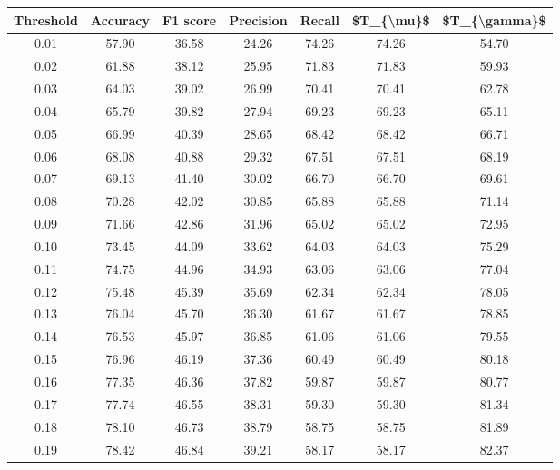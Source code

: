 \begin{tabular}{|c|c|c|c|c|c|c|}
\hline
 Threshold &  Accuracy &  F1 score &  Precision &  Recall &  \$T\_\{\textbackslash mu\}\$ &  \$T\_\{\textbackslash gamma\}\$ \\
\hline
      0.01 &     57.90 &     36.58 &      24.26 &   74.26 &      74.26 &         54.70 \\
      0.02 &     61.88 &     38.12 &      25.95 &   71.83 &      71.83 &         59.93 \\
      0.03 &     64.03 &     39.02 &      26.99 &   70.41 &      70.41 &         62.78 \\
      0.04 &     65.79 &     39.82 &      27.94 &   69.23 &      69.23 &         65.11 \\
      0.05 &     66.99 &     40.39 &      28.65 &   68.42 &      68.42 &         66.71 \\
      0.06 &     68.08 &     40.88 &      29.32 &   67.51 &      67.51 &         68.19 \\
      0.07 &     69.13 &     41.40 &      30.02 &   66.70 &      66.70 &         69.61 \\
      0.08 &     70.28 &     42.02 &      30.85 &   65.88 &      65.88 &         71.14 \\
      0.09 &     71.66 &     42.86 &      31.96 &   65.02 &      65.02 &         72.95 \\
      0.10 &     73.45 &     44.09 &      33.62 &   64.03 &      64.03 &         75.29 \\
      0.11 &     74.75 &     44.96 &      34.93 &   63.06 &      63.06 &         77.04 \\
      0.12 &     75.48 &     45.39 &      35.69 &   62.34 &      62.34 &         78.05 \\
      0.13 &     76.04 &     45.70 &      36.30 &   61.67 &      61.67 &         78.85 \\
      0.14 &     76.53 &     45.97 &      36.85 &   61.06 &      61.06 &         79.55 \\
      0.15 &     76.96 &     46.19 &      37.36 &   60.49 &      60.49 &         80.18 \\
      0.16 &     77.35 &     46.36 &      37.82 &   59.87 &      59.87 &         80.77 \\
      0.17 &     77.74 &     46.55 &      38.31 &   59.30 &      59.30 &         81.34 \\
      0.18 &     78.10 &     46.73 &      38.79 &   58.75 &      58.75 &         81.89 \\
      0.19 &     78.42 &     46.84 &      39.21 &   58.17 &      58.17 &         82.37 \\

\end{tabular}
